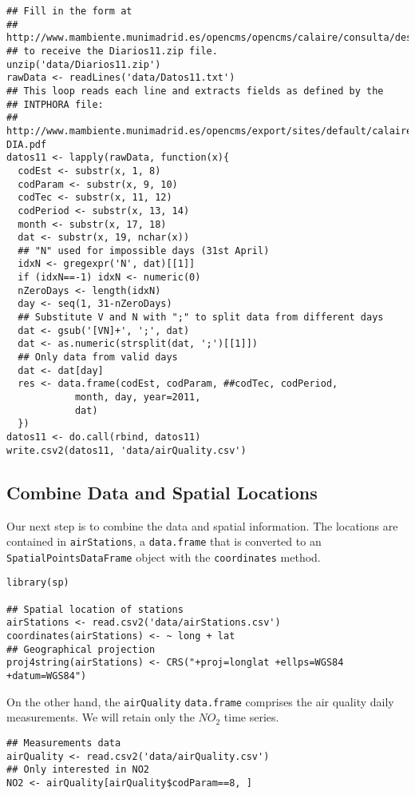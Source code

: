 \lstset{language=R,numbers=none}
\begin{lstlisting}
## Fill in the form at
## http://www.mambiente.munimadrid.es/opencms/opencms/calaire/consulta/descarga.html
## to receive the Diarios11.zip file.
unzip('data/Diarios11.zip')
rawData <- readLines('data/Datos11.txt')
## This loop reads each line and extracts fields as defined by the
## INTPHORA file:
## http://www.mambiente.munimadrid.es/opencms/export/sites/default/calaire/Anexos/INTPHORA-DIA.pdf
datos11 <- lapply(rawData, function(x){
  codEst <- substr(x, 1, 8)
  codParam <- substr(x, 9, 10)
  codTec <- substr(x, 11, 12)
  codPeriod <- substr(x, 13, 14)
  month <- substr(x, 17, 18)
  dat <- substr(x, 19, nchar(x))
  ## "N" used for impossible days (31st April)
  idxN <- gregexpr('N', dat)[[1]]
  if (idxN==-1) idxN <- numeric(0)
  nZeroDays <- length(idxN)
  day <- seq(1, 31-nZeroDays)
  ## Substitute V and N with ";" to split data from different days
  dat <- gsub('[VN]+', ';', dat)
  dat <- as.numeric(strsplit(dat, ';')[[1]])
  ## Only data from valid days
  dat <- dat[day]
  res <- data.frame(codEst, codParam, ##codTec, codPeriod,
		    month, day, year=2011,
		    dat)
  })
datos11 <- do.call(rbind, datos11)
write.csv2(datos11, 'data/airQuality.csv')
\end{lstlisting}
\subsection{Combine Data and Spatial Locations}
\label{sec-1-2}
Our next step is to combine the data and spatial information. The
locations are contained in \texttt{airStations}, a \texttt{data.frame} that is
converted to an \texttt{SpatialPointsDataFrame} object with the \texttt{coordinates}
method.


\lstset{language=R,numbers=none}
\begin{lstlisting}
library(sp)

## Spatial location of stations
airStations <- read.csv2('data/airStations.csv')
coordinates(airStations) <- ~ long + lat
## Geographical projection
proj4string(airStations) <- CRS("+proj=longlat +ellps=WGS84 +datum=WGS84")
\end{lstlisting}

On the other hand, the \texttt{airQuality} \texttt{data.frame} comprises the air
quality daily measurements. We will retain only the $NO_2$ time
series.
\lstset{language=R,numbers=none}
\begin{lstlisting}
## Measurements data
airQuality <- read.csv2('data/airQuality.csv')
## Only interested in NO2 
NO2 <- airQuality[airQuality$codParam==8, ]
\end{lstlisting}

